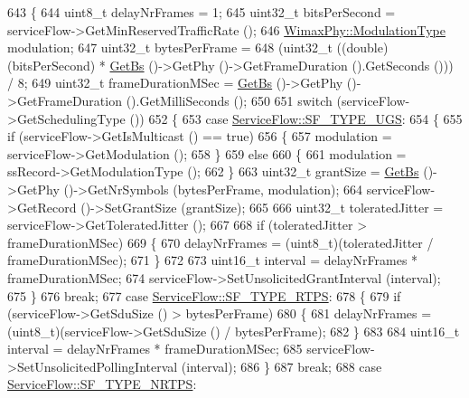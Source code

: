 \begin{DoxyCode}
643 \{
644   uint8\_t delayNrFrames = 1;
645   uint32\_t bitsPerSecond = serviceFlow->GetMinReservedTrafficRate ();
646   \hyperlink{classns3_1_1WimaxPhy_a044c5d8a48ca992c39c2a946f6e755fa}{WimaxPhy::ModulationType} modulation;
647   uint32\_t bytesPerFrame =
648     (uint32\_t ((\textcolor{keywordtype}{double})(bitsPerSecond) * \hyperlink{classns3_1_1UplinkScheduler_afe61b7de71d92d2dff1b135744a6ff7e}{GetBs} ()->GetPhy ()->GetFrameDuration ().GetSeconds ())) / 8;
649   uint32\_t frameDurationMSec = \hyperlink{classns3_1_1UplinkScheduler_afe61b7de71d92d2dff1b135744a6ff7e}{GetBs} ()->GetPhy ()->GetFrameDuration ().GetMilliSeconds ();
650 
651   \textcolor{keywordflow}{switch} (serviceFlow->GetSchedulingType ())
652     \{
653     \textcolor{keywordflow}{case} \hyperlink{classns3_1_1ServiceFlow_a7990ba10be1e098328fd1e6382a26235a969e0b62fa12fef1dbb23913744ed594}{ServiceFlow::SF\_TYPE\_UGS}:
654       \{
655         \textcolor{keywordflow}{if} (serviceFlow->GetIsMulticast () == \textcolor{keyword}{true})
656           \{
657             modulation = serviceFlow->GetModulation ();
658           \}
659         \textcolor{keywordflow}{else}
660           \{
661             modulation = ssRecord->GetModulationType ();
662           \}
663         uint32\_t grantSize = \hyperlink{classns3_1_1UplinkScheduler_afe61b7de71d92d2dff1b135744a6ff7e}{GetBs} ()->GetPhy ()->GetNrSymbols (bytesPerFrame, modulation);
664         serviceFlow->GetRecord ()->SetGrantSize (grantSize);
665 
666         uint32\_t toleratedJitter = serviceFlow->GetToleratedJitter ();
667 
668         \textcolor{keywordflow}{if} (toleratedJitter > frameDurationMSec)
669           \{
670             delayNrFrames = (uint8\_t)(toleratedJitter / frameDurationMSec);
671           \}
672 
673         uint16\_t interval = delayNrFrames * frameDurationMSec;
674         serviceFlow->SetUnsolicitedGrantInterval (interval);
675       \}
676       \textcolor{keywordflow}{break};
677     \textcolor{keywordflow}{case} \hyperlink{classns3_1_1ServiceFlow_a7990ba10be1e098328fd1e6382a26235a0e98ff713b932a029acad7e5b24bbf55}{ServiceFlow::SF\_TYPE\_RTPS}:
678       \{
679         \textcolor{keywordflow}{if} (serviceFlow->GetSduSize () > bytesPerFrame)
680           \{
681             delayNrFrames = (uint8\_t)(serviceFlow->GetSduSize () / bytesPerFrame);
682           \}
683 
684         uint16\_t interval = delayNrFrames * frameDurationMSec;
685         serviceFlow->SetUnsolicitedPollingInterval (interval);
686       \}
687       \textcolor{keywordflow}{break};
688     \textcolor{keywordflow}{case} \hyperlink{classns3_1_1ServiceFlow_a7990ba10be1e098328fd1e6382a26235a7f8577f851a9f01d159442a3a3fcdf48}{ServiceFlow::SF\_TYPE\_NRTPS}:

\end{DoxyCode}
